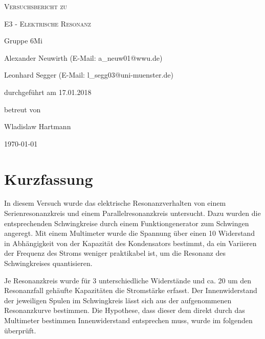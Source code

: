 \documentclass[
	a4paper,
	12pt,
	pagesize,
	ngerman
]{scrartcl}
\begin{document}
	
	\begin{titlepage}
		\centering
		{\scshape\LARGE Versuchsbericht zu \par}
		\vspace{1cm}
		{\scshape\huge E3 - Elektrische Resonanz \par} 
		\vspace{2.5cm}
		{\LARGE Gruppe 6Mi \par}
		\vspace{0.5cm}
		
		{\large Alexander Neuwirth (E-Mail: a\_neuw01@wwu.de) \par}
		{\large Leonhard Segger (E-Mail: l\_segg03@uni-muenster.de) \par}
		\vfill
		
		durchgeführt am 17.01.2018\par
		betreut von\par
		{\large Wladislaw Hartmann} %
		
		\vfill
		
		{\large \today\par}
	\end{titlepage}
	\tableofcontents
	\newpage


	\section{Kurzfassung}
	In diesem Versuch wurde das elektrische Resonanzverhalten von einem Serienresonanzkreis und einem Parallelresonanzkreis untersucht.
	Dazu wurden die entsprechenden Schwingkreise durch einem Funktiongenerator zum Schwingen angeregt.
	Mit einem Multimeter wurde die Spannung über einen \SI{10}{\Omega} Widerstand in Abhängigkeit von der Kapazität des Kondensators bestimmt, da ein Variieren der Frequenz des Stroms weniger praktikabel ist, um die Resonanz des Schwingkreises quantisieren.  %

	Je Resonanzkreis wurde für 3 unterschiedliche  Widerstände und ca. 20 um den Resonanzfall gehäufte Kapazitäten die Stromstärke erfasst.
	Der Innenwiderstand der jeweiligen Spulen im Schwingkreis lässt sich aus der aufgenommenen Resonanzkurve bestimmen.
	Die Hypothese, dass dieser dem direkt durch das Multimeter bestimmen Innenwiderstand entsprechen muss, wurde im folgenden überprüft.
\end{document}
